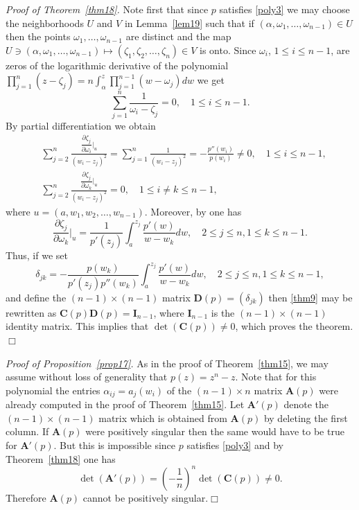 \documentclass[10pt,twoside,a4paper,reqno]{amsart}
\theoremstyle{plain}
\theoremstyle{definition}
\begin{document}
{\noindent
{\em Proof of Theorem~\ref{thm18}.} Note first that since $p$ satisfies 
\eqref{poly3} we may choose the neighborhoods $U$ and $V$ in 
Lemma~\ref{lem19} such that if 
$(\alpha,\omega_{1},\ldots,\omega_{n-1})\in U$ then the points 
$\omega_{1},\ldots,\omega_{n-1}$ are distinct and the map 
$U\ni (\alpha,\omega_{1},\ldots,\omega_{n-1})\mapsto (\zeta_{1},\zeta_{2},
\ldots,\zeta_{n})\in V$ is onto. Since $\omega_{i}$, $1\le i\le n-1$, are 
zeros of the 
logarithmic derivative of the polynomial $\prod_{j=1}^{n}(z-\zeta_{j})=
n\!\int_{\alpha}^{z}\prod_{j=1}^{n-1}(w-\omega_{j})dw$ we get
$$\sum_{j=1}^{n}\frac{1}{\omega_{i}-\zeta_{j}}=0,\quad 1\le i\le n-1.$$
By partial differentiation we obtain
\begin{equation}\label{thm9}
\begin{split}
&\sum_{j=2}^{n}\frac{\dfrac{\partial \zeta_{j}}{\partial \omega_{i}}
\bigg|_{u}}{(w_{i}-z_{j})^2}=\sum_{j=1}^{n}\frac{1}{(w_{i}-z_{j})^2}=
-\frac{p''(w_{i})}{p(w_{i})}\neq 0,\quad 1\le i\le n-1,\\
&\sum_{j=2}^{n}\frac{\dfrac{\partial \zeta_{j}}{\partial \omega_{k}}
\bigg|_{u}}{(w_{i}-z_{j})^2}=0,\quad 1\le i\neq k\le n-1,
\end{split}
\end{equation}
where $u=(a,w_{1},w_{2},\ldots,w_{n-1})$. Moreover, by \cite[Lemma 2.3]{B}
 one has
$$\frac{\partial \zeta_{j}}{\partial \omega_{k}}\bigg|_{u}=
\frac{1}{p'(z_{j})}\int_{a}^{z_{j}}\frac{p'(w)}{w-w_{k}}dw,\quad 2\le j\le n, 
1\le k\le n-1.$$
Thus, if we set
$$\delta_{jk}=-\frac{p(w_{k})}{p'(z_{j})p''(w_{k})}\int_{a}^{z_{j}}
\frac{p'(w)}{w-w_{k}}dw,\quad 2\le j\le n, 1\le k\le n-1,$$
and define the $(n-1)\times (n-1)$ matrix $\mathbf{D}(p)=(\delta_{jk})$ then 
\eqref{thm9} may be rewritten as $\mathbf{C}(p)\mathbf{D}(p)=
\mathbf{I}_{n-1}$, where $\mathbf{I}_{n-1}$ is 
the $(n-1)\times (n-1)$ identity matrix. This implies that 
$\det(\mathbf{C}(p))\neq 0$, which proves the theorem.\hfill $\Box$

\medskip

\noindent
{\em Proof of Proposition~\ref{prop17}.} As in the proof of 
Theorem~\ref{thm15}, we may assume without loss of generality that 
$p(z)=z^n-z$. Note that for this polynomial the entries 
$\alpha_{ij}=a_{j}(w_{i})$ of the 
$(n-1)\times n$ matrix $\mathbf{A}(p)$ were already computed in the proof of 
Theorem~\ref{thm15}. Let $\mathbf{A}'(p)$ denote the $(n-1)\times (n-1)$ 
matrix which is obtained from 
$\mathbf{A}(p)$ by deleting the first column. If $\mathbf{A}(p)$ were 
positively singular then the same would have to be true for $\mathbf{A}'(p)$. 
But this is impossible since $p$ 
satisfies \eqref{poly3} and by Theorem~\ref{thm18} one has 
$$\det(\mathbf{A}'(p))=\left(-\frac{1}{n}\right)^{n}
\det(\mathbf{C}(p))\neq 0.$$
Therefore $\mathbf{A}(p)$ cannot be positively 
singular.\hfill $\Box$ 

}
\end{document}
